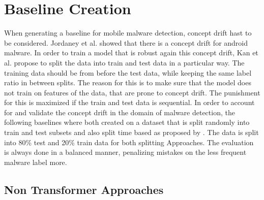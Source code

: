 \section{Baseline Creation}
\label{sec:baseline}

When generating a baseline for mobile malware detection, concept drift hast to be considered.
Jordaney et al. \cite{transcend} showed that there is a concept drift for android malware.
In order to train a model that is robust again this concept drift, 
Kan et al. \cite{tesseract} propose to split the data into train and test data in a particular way.
The training data should be from before the test data, 
while keeping the same label ratio in between splits.  
The reason for this is to make sure that the model does not train on features of the data, 
that are prone to concept drift.
The punishment for this is maximized if the train and test data is sequential.
In order to account for and validate the concept drift in the domain of malware detection,
the following baselines where both created on a dataset that is split randomly into train and test subsets
and also split time based as proposed by \cite{transcend}.
The data is split into 80\% test and 20\% train data for both splitting Approaches.
The evaluation is always done in a balanced manner, penalizing mistakes on the less frequent malware label more.

\subsection{Non Transformer Approaches}

